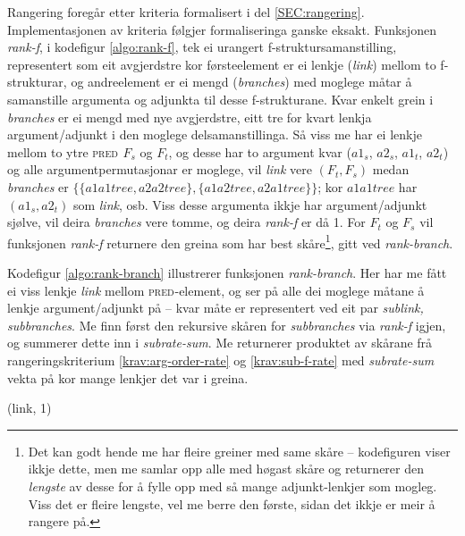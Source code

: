 \documentclass[12pt,a4paper,oneside,draft]{report}
\newcommand{\F}[2]{\textsc{#1}\ensuremath{_{#2}}}
\newcommand{\PRED}{\F{pred}{}}
\begin{document}
\label{SEC:impl-f-rangering}

 Rangering foregår etter kriteria formalisert i del
 \ref{SEC:rangering}. Implementasjonen av kriteria følgjer
 formaliseringa ganske eksakt. Funksjonen \emph{rank-f}, i kodefigur
 \ref{algo:rank-f}, tek ei urangert f\hyp{}struktursamanstilling,
 representert som eit avgjerdstre kor førsteelement er ei lenkje
 (\emph{link}) mellom to f\hyp{}strukturar, og andreelement er ei mengd
 (\emph{branches}) med moglege måtar å samanstille argumenta og adjunkta
 til desse f\hyp{}strukturane. Kvar enkelt grein i \emph{branches} er ei
 mengd med nye avgjerdstre, eitt tre for kvart lenkja argument/adjunkt
 i den moglege delsamanstillinga. Så viss me har ei lenkje mellom to
 ytre \PRED{} $F_s$ og $F_t$, og desse har to argument kvar ($a1_s$,
 $a2_s$, $a1_t$, $a2_t$) og alle argumentpermutasjonar er moglege, vil
 \emph{link} vere $(F_t,F_s)$ medan \emph{branches} er $\{ \{ a1a1tree, a2a2tree
 \}, \{ a1a2tree, a2a1tree \} \}$; kor $a1a1tree$ har $(a1_s, a2_t)$
 som \emph{link}, osb. Viss desse argumenta ikkje har argument/adjunkt
 sjølve, vil deira \emph{branches} vere tomme, og deira \emph{rank-f} er
 då 1. For $F_t$ og $F_s$ vil funksjonen \emph{rank-f} returnere den greina
 som har best skåre\footnote{Det kan godt hende me har fleire greiner med same skåre --
        kodefiguren viser ikkje dette, men me samlar opp alle med
        høgast skåre og returnerer den \emph{lengste} av desse for å fylle
        opp med så mange adjunkt-lenkjer som mogleg. Viss det er
        fleire lengste, vel me berre den første, sidan det ikkje er
        meir å rangere på. }, gitt ved \emph{rank-branch}.

 Kodefigur \ref{algo:rank-branch} illustrerer funksjonen
 \emph{rank-branch}. Her har me fått ei viss lenkje \emph{link} mellom
 \PRED{}-element, og ser på alle dei moglege måtane å lenkje
 argument/adjunkt på -- kvar måte er representert ved eit par
 \emph{sublink, subbranches}. Me finn først den rekursive skåren for
 \emph{subbranches} via \emph{rank-f} igjen, og summerer dette inn i
 \emph{subrate-sum}. Me returnerer produktet av skårane frå
 rangeringskriterium \ref{krav:arg-order-rate} og
 \ref{krav:sub-f-rate} med \emph{subrate-sum} vekta på kor mange lenkjer
 det var i greina.

     \begin{algorithm}[htbp]
      \caption{rank-f(seen, link, branches)}
      \label{algo:rank-f}

       {\Return (link, 1)}
      \end{algorithm}
\end{document}
